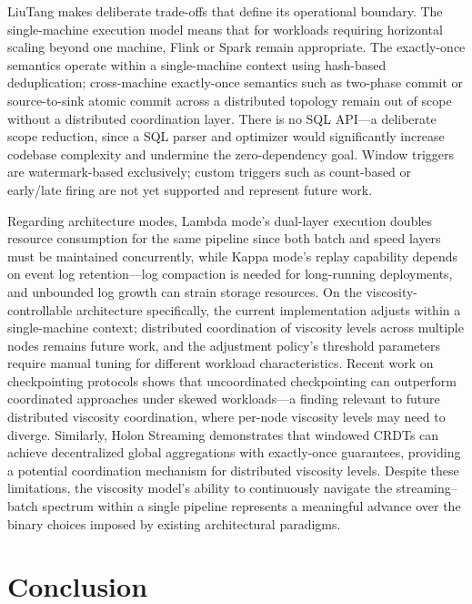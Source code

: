 \documentclass[conference]{IEEEtran}
\begin{document}
LiuTang makes deliberate trade-offs that define its operational boundary. The single-machine execution model means that for workloads requiring horizontal scaling beyond one machine, Flink or Spark remain appropriate. The exactly-once semantics operate within a single-machine context using hash-based deduplication; cross-machine exactly-once semantics such as two-phase commit or source-to-sink atomic commit across a distributed topology remain out of scope without a distributed coordination layer. There is no SQL API---a deliberate scope reduction, since a SQL parser and optimizer would significantly increase codebase complexity and undermine the zero-dependency goal. Window triggers are watermark-based exclusively; custom triggers such as count-based or early/late firing are not yet supported and represent future work.

Regarding architecture modes, Lambda mode's dual-layer execution doubles resource consumption for the same pipeline since both batch and speed layers must be maintained concurrently, while Kappa mode's replay capability depends on event log retention---log compaction is needed for long-running deployments, and unbounded log growth can strain storage resources. On the viscosity-controllable architecture specifically, the current implementation adjusts within a single-machine context; distributed coordination of viscosity levels across multiple nodes remains future work, and the adjustment policy's threshold parameters require manual tuning for different workload characteristics. Recent work on checkpointing protocols \cite{siachamis2024checkmate} shows that uncoordinated checkpointing can outperform coordinated approaches under skewed workloads---a finding relevant to future distributed viscosity coordination, where per-node viscosity levels may need to diverge. Similarly, Holon Streaming \cite{spenger2025holon} demonstrates that windowed CRDTs can achieve decentralized global aggregations with exactly-once guarantees, providing a potential coordination mechanism for distributed viscosity levels. Despite these limitations, the viscosity model's ability to continuously navigate the streaming--batch spectrum within a single pipeline represents a meaningful advance over the binary choices imposed by existing architectural paradigms.

\section{Conclusion}
\end{document}

